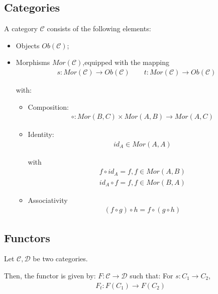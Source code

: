 \documentclass[Total.tex]{subfiles}
\begin{document}
			\subsection{Categories}
				\begin{Def}
					A category $\mathcal{C}$ consists of the following elements:
					\begin{itemize}
						\item Objects $Ob(\mathcal{C})$;
						\item Morphisms $Mor(\mathcal{C})$,equipped with the mapping
						\begin{gather*}
							s:Mor(\mathcal{C})\rightarrow Ob(\mathcal{C})\qquad t:Mor(\mathcal{C})\rightarrow Ob(\mathcal{C})
						\end{gather*}
						
						with:
						\begin{itemize}
							\item Composition:
							\begin{gather*}
								\circ:  Mor(B,C)\times Mor(A,B)\rightarrow Mor(A,C)
							\end{gather*}
							
							\item Identity: 
							\begin{gather*}
								id_A\in Mor(A,A)
							\end{gather*}
							
							with
							\begin{gather*}
								f\circ id_A=f,f\in Mor(A,B)\\
								id_A\circ f=f,f\in Mor(B,A)
							\end{gather*}
							
							\item Associativity
							\begin{gather*}
								(f\circ g)\circ h=f\circ (g\circ h)
							\end{gather*}
						\end{itemize}
					\end{itemize}
				\end{Def}
			\subsection{Functors}
				\begin{Def}
					Let $\mathcal{C},\mathcal{D}$ be two categories. 
					
					Then, the functor is given by: $F:\mathcal{C}\rightarrow \mathcal{D}$ such that: For $s:C_1\rightarrow C_2$, 
					\begin{gather*}
						F_t:F(C_1)\rightarrow F(C_2)
					\end{gather*}
				\end{Def}
				
\end{document}
